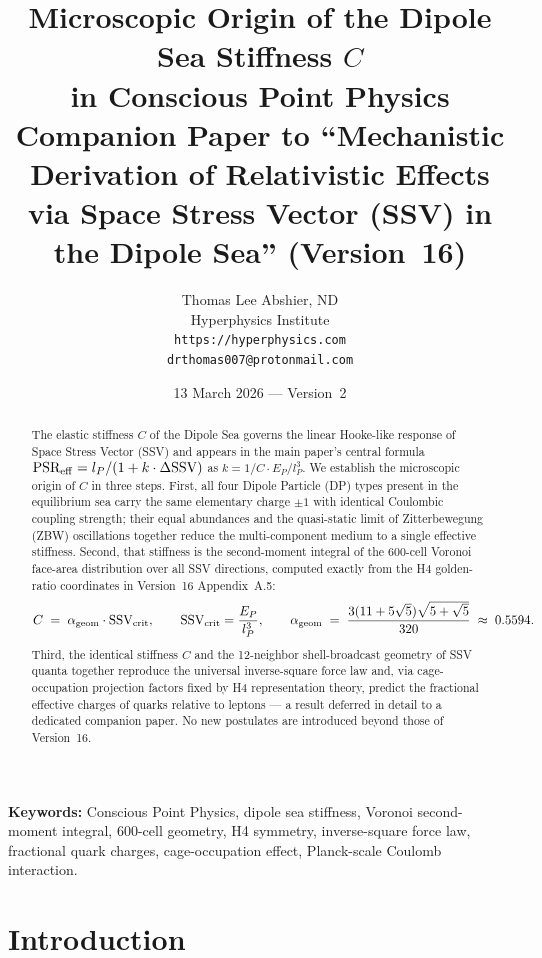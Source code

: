 \documentclass[12pt]{article}
\title{\textbf{Microscopic Origin of the Dipole Sea Stiffness \boldmath$C$\\
in Conscious Point Physics}\\[6pt]
{\large Companion Paper to ``Mechanistic Derivation of Relativistic Effects\\
via Space Stress Vector (SSV) in the Dipole Sea'' (Version~16)}}
\author{Thomas Lee Abshier, ND\\
Hyperphysics Institute\\
\texttt{https://hyperphysics.com}\\
\texttt{drthomas007@protonmail.com}}
\date{13 March 2026 --- Version~2}
\newcommand{\lP}{l_P}
\newcommand{\EP}{E_P}
\newcommand{\SSV}{\text{SSV}}
\newcommand{\PSR}{\text{PSR}}
\newcommand{\alphageom}{\alpha_{\rm geom}}
\newcommand{\SSVcrit}{\SSV_{\rm crit}}
\begin{document}
\maketitle

\noindent\textbf{Keywords:} Conscious Point Physics, dipole sea stiffness,
Voronoi second-moment integral, 600-cell geometry, H4 symmetry,
inverse-square force law, fractional quark charges, cage-occupation effect,
Planck-scale Coulomb interaction.

\begin{abstract}
The elastic stiffness $C$ of the Dipole Sea governs the linear Hooke-like
response of Space Stress Vector (SSV) and appears in the main paper's central
formula $\PSR_{\rm eff} = \lP/(1 + k\cdot\Delta\SSV)$ as $k = 1/C\cdot\EP/\lP^3$.
We establish the microscopic origin of $C$ in three steps.  First, all four
Dipole Particle (DP) types present in the equilibrium sea carry the same
elementary charge $\pm 1$ with identical Coulombic coupling strength; their
equal abundances and the quasi-static limit of Zitterbewegung (ZBW)
oscillations together reduce the multi-component medium to a single effective
stiffness.  Second, that stiffness is the second-moment integral of the
600-cell Voronoi face-area distribution over all SSV directions, computed
exactly from the H4 golden-ratio coordinates in Version~16 Appendix~A.5:
\[
  C \;=\; \alphageom \cdot \SSVcrit,\qquad
  \SSVcrit = \frac{\EP}{\lP^3},\qquad
  \alphageom \;=\; \frac{3(11+5\sqrt{5})\sqrt{5+\sqrt{5}}}{320}
  \;\approx\; 0.5594.
\]
Third, the identical stiffness $C$ and the 12-neighbor shell-broadcast
geometry of SSV quanta together reproduce the universal inverse-square force
law and, via cage-occupation projection factors fixed by H4 representation
theory, predict the fractional effective charges of quarks relative to
leptons --- a result deferred in detail to a dedicated companion paper.
No new postulates are introduced beyond those of Version~16.
\end{abstract}

\section{Introduction}
\label{sec:intro}
\end{document}
